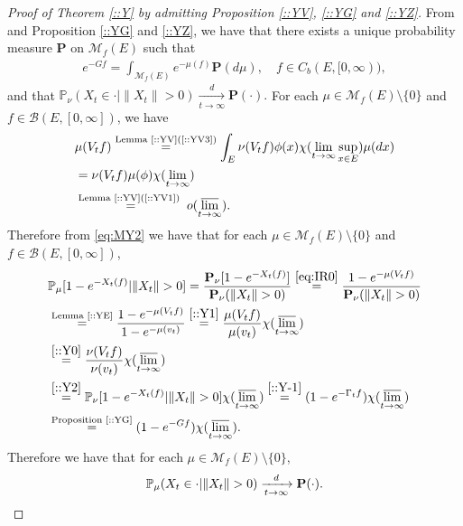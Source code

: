 \documentclass[12pt,a4paper]{amsart}
\numberwithin{equation}{section}
\theoremstyle{plain}
\theoremstyle{definition}
\theoremstyle{remark}
\begin{document}
\begin{proof}[Proof of Theorem \ref{::Y} by admitting Proposition \ref{::YV}, \ref{::YG} and \ref{::YZ}]
From \cite[Proposition 1.19]{Li2011MeasureValued} and Proposition \ref{::YG} and \ref{::YZ}, we have that there exists a unique probability measure $\mathbf P$ on $\mathcal M_f(E)$ such that 
\begin{align}
  e^{-Gf}
  = \int_{\mathcal M_f(E)} e^{- \mu(f)} \mathbf P(d\mu)
  , \quad f\in C_b (E, [0,\infty)),
\end{align}
and that
\(	
\mathbb P_{\nu}(X_t \in \cdot | \|X_t\|>0 ) 
  \xrightarrow[t\to \infty]{d} \mathbf P(\cdot).
\)
For each $\mu \in \mathcal M_f(E)\setminus \{0\}$ and $f \in \mathcal B(E,[0,\infty])$, we have 
\begin{align}
	& \mu(V_tf) 
   \overset{\text{Lemma \ref{::YV}(\ref{::YV3})}}=  \int_E \nu(V_tf) \phi(x) \chi(\lim_{t\to \infty}\sup_{x\in E}) \mu(dx)
   \\ \label{::Y0} &= \nu(V_tf) \mu(\phi)\chi(\lim_{t\to \infty})
   \\ \label{::Y1} &\overset{\text{Lemma \ref{::YV}(\ref{::YV1}) } }= o(\varlimsup_{t\to \infty}).
\end{align}
Therefore from \eqref{eq:MY2} we have that for each $\mu \in \mathcal M_f(E)\setminus\{0\}$ and $f\in \mathcal B(E,[0,\infty])$, 
\begin{align}
  &\mathbb P_\mu [1 - e^{-X_t(f)}|\|X_t\|>0]
    = \frac{ \mathbf P_\nu [ 1 - e^{- X_t(f)}]}{ \mathbf P_\nu (\|X_t\| > 0)}
  \overset{\eqref{eq:IR0}}= \frac{1 - e^{- \mu(V_tf)}}{ \mathbf P_\nu(\|X_t\| > 0) }
  \\ & \overset{\text{Lemma \ref{::YE}}}  = \frac{1 - e^{- \mu(V_tf)}}{1 - e^{-\mu(v_t)}}
  \overset{\eqref{::Y1}}= \frac{\mu(V_tf)}{\mu(v_t)} \chi(\varlimsup_{t\to \infty})
  \\ \label{::Y2} &\overset{\eqref{::Y0}}= \frac{\nu(V_tf)}{\nu(v_t)}\chi(\varlimsup_{t\to \infty}) 
  \\ &\overset{\eqref{::Y2}}= \mathbb P_\nu [1 - e^{-X_t(f)}|\|X_t\|>0]  \chi(\varlimsup_{t\to \infty})
       \overset{\eqref{::Y-1}}= (1 - e^{- \Gamma_t f}) \chi(\varlimsup_{t\to \infty})
  \\  &\overset{\text{Proposition \ref{::YG}}}= (1 - e^{-Gf}) \chi(\varlimsup_{t\to \infty}).
\end{align}
Therefore we have that for each $\mu \in \mathcal M_f(E)\setminus\{0\}$,
\[
  \mathbb P_\mu(X_t \in \cdot | \|X_t\|>0)
  \xrightarrow[t\to \infty]{d} \mathbf P(\cdot).
  \qedhere
\]
\end{proof}
\end{document}
